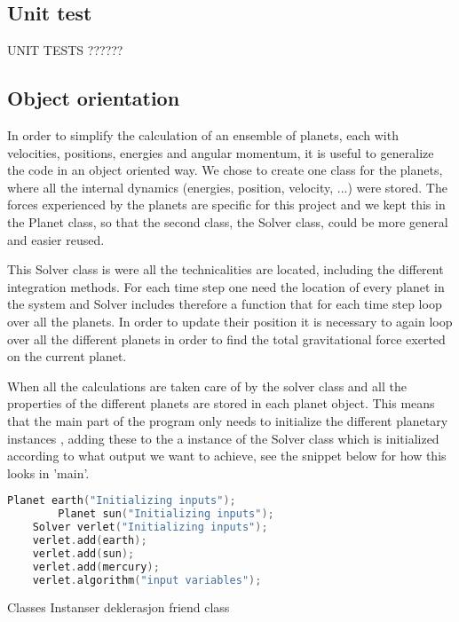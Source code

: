 \subsection{Unit test}
UNIT TESTS ??????


\subsection{Object orientation}
In order to simplify the calculation of an ensemble of planets, each with velocities, positions, energies and angular momentum, it is useful to generalize the code in an object oriented way. We chose to create one class for the planets, where all the internal dynamics (energies, position, velocity, ...) were stored. The forces experienced by the planets are specific for this project and we kept this in the Planet class, so that the second class, the Solver class, could be more general and easier reused.

This Solver class is were all the technicalities are located, including the different integration methods. For each time step one need the location of every planet in the system and Solver includes therefore a function that for each time step loop over all the planets. In order to update their position it is necessary to again loop over all the different planets in order to find the total gravitational force exerted on the current planet.  

When all the calculations are taken care of by the solver class and all the properties of the different planets are stored in each planet object. This means that the main part of the program only needs to initialize the different planetary instances , adding these to the a instance of the Solver class which is initialized according to what output we want to achieve, see the snippet below for how this looks in 'main'. 
 
\begin{lstlisting}[language=C++]
	Planet earth("Initializing inputs");
		Planet sun("Initializing inputs");
	Solver verlet("Initializing inputs");
	verlet.add(earth);
	verlet.add(sun);
	verlet.add(mercury);
	verlet.algorithm("input variables");
\end{lstlisting}


Classes
	Instanser
	deklerasjon
	friend class
	